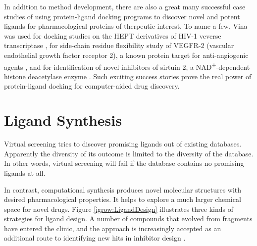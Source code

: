 In addition to method development, there are also a great many successful case studies of using protein-ligand docking programs to discover novel and potent ligands for pharmacological proteins of therpeutic interest. To name a few, Vina was used for docking studies on the HEPT derivatives of HIV-1 veverse transcriptase \citep{843}, for side-chain residue flexibility study of VEGFR-2 (vascular endothelial growth factor receptor 2), a known protein target for anti-angiogenic agents \citep{1084}, and for identification of novel inhibitors of sirtuin 2, a NAD\textsuperscript{+}-dependent histone deacetylase enzyme \citep{1177}. Such exciting success stories prove the real power of protein-ligand docking for computer-aided drug discovery.

\section{Ligand Synthesis}



Virtual screening tries to discover promising ligands out of existing databases. Apparently the diversity of its outcome is limited to the diversity of the database. In other words, virtual screening will fail if the database contains no promising ligands at all.

In contrast, computational synthesis produces novel molecular structures with desired pharmacological properties. It helps to explore a much larger chemical space for novel drugs. Figure \ref{igrow:LigandDesign} \citep{363} illustrates three kinds of strategies for ligand design. A number of compounds that evolved from fragments have entered the clinic, and the approach is increasingly accepted as an additional route to identifying new hits in inhibitor design \citep{363,470}.


